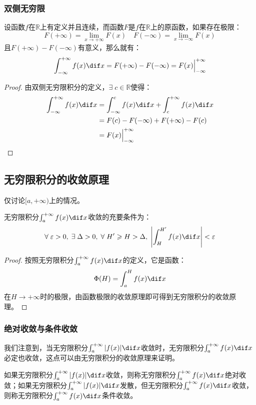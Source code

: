 \subsubsection{双侧无穷限}
\begin{theorem}
	设函数$f$在$\mathbb{R}$上有定义并且连续，而函数$F$是$f$在$\mathbb{R}$上的原函数，如果存在极限：
	\begin{equation*}
		F(+\infty)=\lim_{x\to+\infty}F(x)\quad
		F(-\infty)=\lim_{x\to-\infty}F(x)
	\end{equation*}
	且$F(+\infty)-F(-\infty)$有意义，那么就有：
	\begin{equation*}
		\int_{-\infty}^{+\infty}f(x)\dif x=F(+\infty)-F(-\infty)=F(x)\Big|_{-\infty}^{+\infty}
	\end{equation*}
\end{theorem}
\begin{proof}
	由双侧无穷限积分的定义，$\exists\;c\in\mathbb{R}$使得：
	\begin{align*}
		\int_{-\infty}^{+\infty}f(x)\dif x
		&=\int_{-\infty}^{c}f(x)\dif x+\int_{c}^{+\infty}f(x)\dif x \\
		&=F(c)-F(-\infty)+F(+\infty)-F(c) \\
		&=F(x)\Big|_{-\infty}^{+\infty}\qedhere
	\end{align*}
\end{proof}

\subsection{无穷限积分的收敛原理}
仅讨论$[a,+\infty)$上的情况。
\begin{theorem}
	无穷限积分$\int_{a}^{+\infty}f(x)\dif x$收敛的充要条件为：
	\begin{equation*}
		\forall\;\varepsilon>0,\;\exists\;\Delta>0,\;\forall\;H'\geqslant H>\Delta,\;\left|\int_{H}^{H'}f(x)\dif x\right|<\varepsilon
	\end{equation*}
\end{theorem}
\begin{proof}
	按照无穷限积分$\int_{a}^{+\infty}f(x)\dif x$的定义，它是函数：
	\begin{equation*}
		\Phi(H)=\int_{a}^{H}f(x)\dif x
	\end{equation*}
	在$H\to+\infty$时的极限，由函数极限的收敛原理即可得到无穷限积分的收敛原理。
\end{proof}
\subsubsection{绝对收敛与条件收敛}
我们注意到，当无穷限积分$\int_{a}^{+\infty}|f(x)|\dif x$收敛时，无穷限积分$\int_{a}^{+\infty}f(x)\dif x$必定也收敛，这点可以由无穷限积分的收敛原理来证明。
\begin{definition}
	如果无穷限积分$\int_{a}^{+\infty}|f(x)|\dif x$收敛，则称无穷限积分$\int_{a}^{+\infty}f(x)\dif x$绝对收敛；如果无穷限积分$\int_{a}^{+\infty}|f(x)|\dif x$发散，但无穷限积分$\int_{a}^{+\infty}f(x)\dif x$收敛，则称无穷限积分$\int_{a}^{+\infty}f(x)\dif x$条件收敛。
\end{definition}

